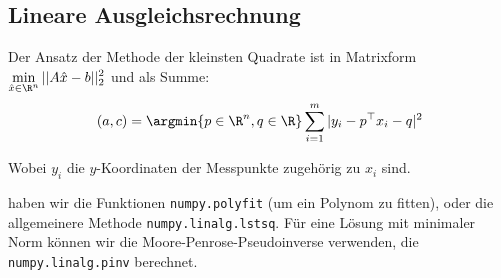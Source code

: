 \subsection{Lineare Ausgleichsrechnung}
Der Ansatz der Methode der kleinsten Quadrate ist in Matrixform $\displaystyle \min_{\hat{x} \in \R^n} ||A\hat{x} - b||_2^2$ und als Summe:
\drmvspace
\begin{align*}
    (a, c) = \argmin{p \in \R^n, q \in \R} \sum_{i = 1}^{m} |y_i - p^{\top} x_i - q|^2
\end{align*}

\drmvspace
Wobei $y_i$ die $y$-Koordinaten der Messpunkte zugehörig zu $x_i$ sind.

\innumpy haben wir die Funktionen \texttt{numpy.polyfit} (um ein Polynom zu fitten), oder die allgemeinere Methode \texttt{numpy.linalg.lstsq}.
Für eine Lösung mit minimaler Norm können wir die Moore-Penrose-Pseudoinverse verwenden, die \texttt{numpy.linalg.pinv} berechnet.
